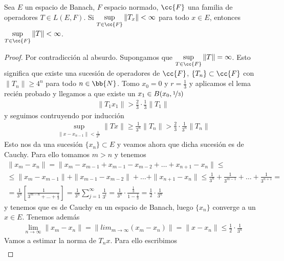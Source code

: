 \begin{prop}

    Sea $E$ un espacio de Banach, $F$ espacio normado, $\cc{F}$ una familia de operadores $T\in L(E,F)$. Si $\sup\limits_{T\in \cc{F}} \|T_x\| < \infty$ para todo $x\in E$, entonces $\sup\limits_{T\in \cc{F}} \|T\|<\infty$.

    \begin{proof}
        Por contradicción al absurdo. Supongamos que $\sup\limits_{T\in \cc{F}} \|T\| = \infty$. Esto significa que existe una sucesión de operadores de $\cc{F}$, $\{T_n\}\subset \cc{F}$ con $\|T_n\|\geq 4^n$ para todo $n\in \bb{N}$. Tomo $x_0=0$ y $r=\frac{1}{3}$ y aplicamos el lema recién probado y llegamos a que existe un $x_1\in B(x_0, \nicefrac{1}{3})$
        \begin{gather*}
            \|T_1x_1\| > \frac{2}{3} \cdot \frac{1}{3} \|T_1\|
        \end{gather*}
        y seguimos contruyendo por inducción
        \begin{gather*}
            \sup\limits_{\|x-x_{n-1}\| < \frac{1}{3^n}} \|Tx\| \geq \frac{1}{3^n} \|T_n\| > \frac{2}{3} \cdot \frac{1}{3^n} \|T_n\|
        \end{gather*}
        Esto nos da una sucesión $\{x_n\}\subset E$ y veamos ahora que dicha sucesión es de Cauchy. Para ello tomamos $m>n$ y tenemos
        \begin{gather*}
            \|x_m-x_n\| = \|x_m-x_{m-1}+x_{m-1} - x_{m-2} + \dots + x_{n+1} - x_n \| \leq\\
            \leq  \|x_m - x_{m-1}\| + \|x_{m-1} - x_{m-2}\| + \dots + \|x_{n+1} - x_n\| \leq \frac{1}{3^n} + \frac{1}{3^{m-1}} + \dots + \frac{1}{3^{n+1}} =\\
            = \frac{1}{3^n} \left[\frac{1}{3^{m-n} + \dots + \frac{1}{3}}\right] = \frac{1}{3^n} \sum_{j=1}^\infty \frac{1}{3^t} = \frac{1}{3^n} \cdot \frac{\frac{1}{3}}{1-\frac{1}{3}} = \frac{1}{2} \cdot \frac{1}{3^n}
        \end{gather*}
        y tenemos que es de Cauchy en un espacio de Banach, luego $\{x_n\}$ converge a un $x\in E$. Tenemos además
        \begin{gather*}
            \lim_{n\to\infty} \|x_m-x_n\| = \|lim_{m\to \infty} (x_m-x_n)\| = \|x-x_n\| \leq \frac{1}{2} \cdot \frac{1}{3^n}
        \end{gather*}
        Vamos a estimar la norma de $T_nx$. Para ello escribimos
        \begin{gather*}

\end{gather*}
\end{proof}
\end{prop}
